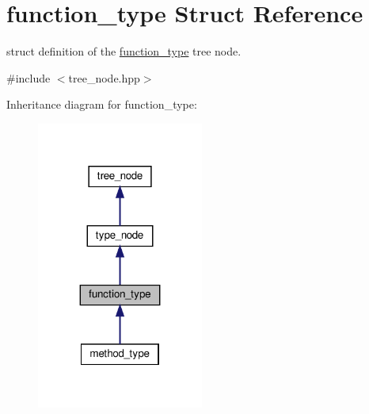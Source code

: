 \hypertarget{structfunction__type}{}\section{function\+\_\+type Struct Reference}
\label{structfunction__type}


struct definition of the \hyperlink{structfunction__type}{function\+\_\+type} tree node.  




{\ttfamily \#include $<$tree\+\_\+node.\+hpp$>$}



Inheritance diagram for function\+\_\+type\+:
\nopagebreak
\begin{figure}[H]
\begin{center}
\leavevmode
\includegraphics[width=155pt]{d1/d7e/structfunction__type__inherit__graph}
\end{center}
\end{figure}


